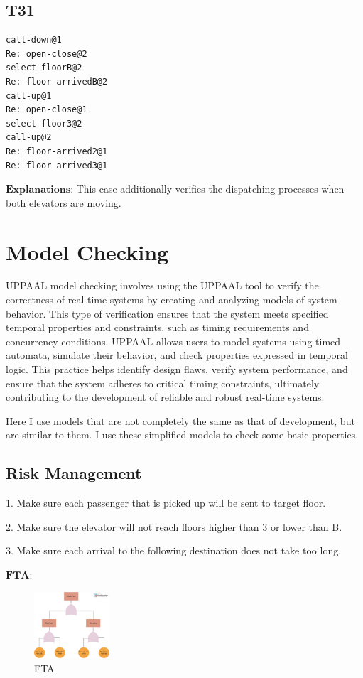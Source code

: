 \documentclass{article}
\begin{document}
\subsection*{T31}
\begin{lstlisting}
call-down@1
Re: open-close@2
select-floorB@2
Re: floor-arrivedB@2
call-up@1
Re: open-close@1
select-floor3@2
call-up@2
Re: floor-arrived2@1
Re: floor-arrived3@1
\end{lstlisting}
$\textbf{Explanations:}$ This case additionally verifies the dispatching processes when both elevators are moving.

\newpage
\section{Model Checking}

UPPAAL model checking involves using the UPPAAL tool to verify the correctness of real-time systems by creating and analyzing models of system behavior. This type of verification ensures that the system meets specified temporal properties and constraints, such as timing requirements and concurrency conditions. UPPAAL allows users to model systems using timed automata, simulate their behavior, and check properties expressed in temporal logic. This practice helps identify design flaws, verify system performance, and ensure that the system adheres to critical timing constraints, ultimately contributing to the development of reliable and robust real-time systems.

Here I use models that are not completely the same as that of development, but are similar to them. I use these simplified models to check some basic properties.
\subsection*{Risk Management}

1. Make sure each passenger that is picked up will be sent to target floor.

2. Make sure the elevator will not reach floors higher than 3 or lower than B.

3. Make sure each arrival to the following destination does not take too long.

$\textbf{FTA:}$

\begin{figure}[htbp]
    \centering
    \includegraphics[width=0.25\textwidth]{img/ft.png}
    \caption{FTA}
\end{figure}
\end{document}
